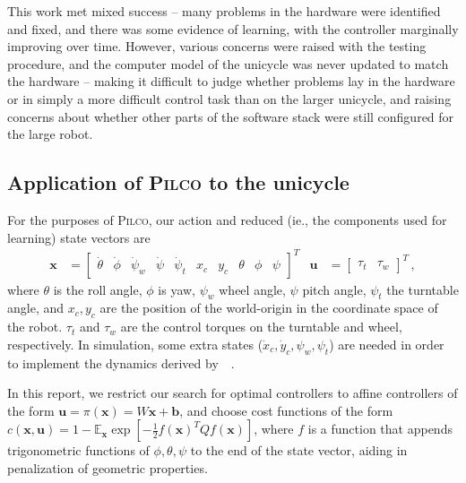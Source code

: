 \documentclass[main.tex]{subfiles}
\begin{document}
	This work met mixed success -- many problems in the hardware were identified and fixed, and there was some evidence of learning, with the controller marginally improving over time.
	However, various concerns were raised with the testing procedure, and the computer model of the unicycle was never updated to match the hardware -- making it difficult to judge whether problems lay in the hardware or in simply a more difficult control task than on the larger unicycle, and raising concerns about whether other parts of the software stack were still configured for the large robot.

	\subsection{Application of \textsc{Pilco} to the unicycle}
		For the purposes of \textsc{Pilco}, our action and reduced (ie., the components used for learning) state vectors are
		\begin{align}
			\bm{x} &= \begin{bmatrix}
				\dot\theta & \dot\phi &\dot\psi_w & \dot\psi & \dot\psi_t &
				x_c & y_c &
				\theta &
				\phi & \psi
			\end{bmatrix}^T &
			\bm{u} &= \begin{bmatrix}
				\tau_t & \tau_w
			\end{bmatrix}^T\,, \label{eq:state-vars}
		\end{align}
		where $\theta$ is the roll angle, $\phi$ is yaw, $\psi_w$ wheel angle,
		$\psi$ pitch angle, $\psi_t$ the turntable angle, and $x_c, y_c$ are the position of the world-origin in the coordinate space of the robot.
		$\tau_t$ and $\tau_w$ are the control torques on the turntable and wheel, respectively.
		In simulation, some extra states ($\dot{x}_c, \dot{y}_c, \psi_w, \psi_t$) are needed in order to implement the dynamics derived by~\citeauthor{forster}~\cite{forster}.

		In this report, we restrict our search for optimal controllers to affine controllers of the form
		$\bm{u} = \pi(\bm{x}) = W\bm{x} + \bm{b}$, and choose cost functions of the form
		$c(\bm{x}, \bm{u}) = 1 - \mathbb{E}_{\bm{x}} \exp\left[-\frac{1}{2} f(\bm{x})^T Q f(\bm{x})\right]$, where $f$ is a function that appends trigonometric functions of $\phi, \theta, \psi$ to the end of the state vector, aiding in penalization of geometric properties.
\end{document}
